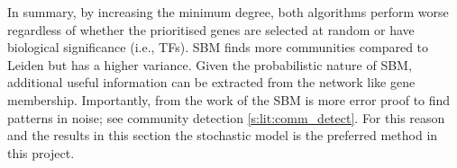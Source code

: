In summary, by increasing the minimum degree, both algorithms perform worse regardless of whether the prioritised genes are selected at random or have biological significance (i.e., TFs). SBM finds more communities compared to Leiden but has a higher variance. Given the probabilistic nature of SBM, additional useful information can be extracted from the network like gene membership. Importantly, from the work of \cite{Peixoto2023-mw} the SBM is more error proof to find patterns in noise; see community detection \cref{s:lit:comm_detect}. For this reason and the results in this section the stochastic model is the preferred method in this project.


